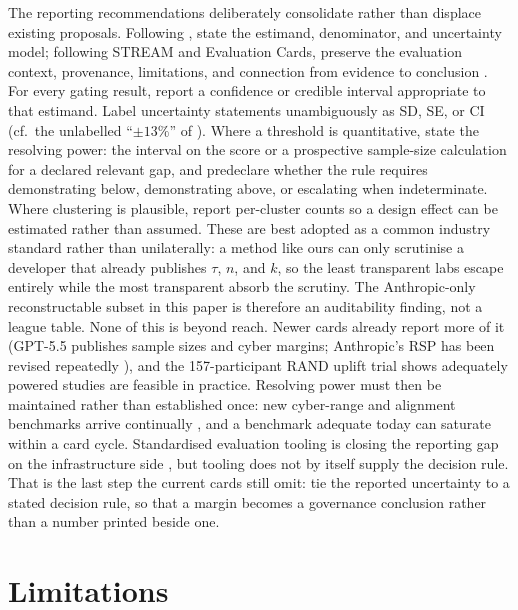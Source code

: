 \documentclass{article}
\begin{document}
The reporting recommendations deliberately consolidate rather than displace existing
proposals. Following \citet{miller2024adding,keller2026nist}, state the estimand, denominator,
and uncertainty model; following STREAM and Evaluation Cards, preserve the evaluation
context, provenance, limitations, and connection from evidence to conclusion
\citep{mccaslin2025stream,ghosh2026evaluationcards}. For every gating result, report a
confidence or credible interval appropriate to that estimand. Label
uncertainty statements unambiguously as SD, SE, or CI (cf.\ the unlabelled ``$\pm 13\%$'' of ). Where a threshold is quantitative, state the resolving power: the
interval on the score or a prospective sample-size calculation for a declared relevant gap,
and predeclare whether the rule requires demonstrating below, demonstrating above, or
escalating when indeterminate. Where
clustering is plausible, report per-cluster counts so a design effect can be estimated
rather than assumed. These are best adopted as a common industry standard rather than
unilaterally: a method like ours can only scrutinise a developer that already publishes
$\tau$, $n$, and $k$, so the least transparent labs escape entirely while the most
transparent absorb the scrutiny. The Anthropic-only reconstructable subset in this paper is
therefore an auditability finding, not a league table. None of this
is beyond reach. Newer cards already report more of it (GPT-5.5 publishes sample sizes and
cyber margins; Anthropic's RSP has been revised repeatedly
\citep{openai2026gpt55,anthropic2026rsp}), and the 157-participant RAND uplift trial
\citep{rand2026uplift} shows adequately powered studies are feasible in practice. Resolving power must then be maintained rather than established once: new cyber-range and alignment benchmarks arrive continually \citep{liu2026agentcyberrange,souly2026alignment}, and a benchmark adequate today can saturate within a card cycle. Standardised evaluation tooling is closing the reporting gap on the infrastructure side \citep{uk_aisi_inspect}, but tooling does not by itself supply the decision rule. That is the last step the current cards still omit: tie the reported uncertainty to a stated decision rule, so that a margin becomes a governance conclusion rather than a number printed beside one.



\section{Limitations}
\label{sec:limitations}
\end{document}

